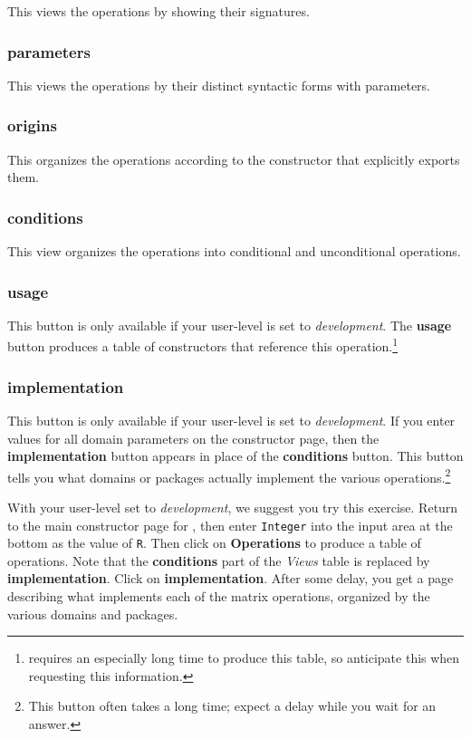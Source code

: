 {This views the operations by showing their signatures.

\subsubsection{parameters}

This views the operations by their distinct syntactic forms with
parameters.

\subsubsection{origins}

This organizes the operations according to the constructor that
explicitly exports them.

\subsubsection{conditions}

This view organizes the operations into conditional and unconditional
operations.

\subsubsection{usage}

This button is only available if your user-level is set to {\it
{}
development}.
The {\bf usage} button produces a table of constructors that reference this
operation.\footnote{\Language{} requires an especially long time to
produce this table, so anticipate this when requesting this
information.}

\subsubsection{implementation}

This button is only available if your user-level is set to {\it
development}.
If you enter values for all domain parameters on the constructor page,
then the {\bf implementation} button appears in place of the {\bf
conditions} button.
This button tells you what domains or packages actually implement the
various operations.\footnote{This button often takes a long time; expect
a delay while you wait for an answer.}

With your user-level set to {\it development}, we suggest you try this
exercise.
Return to the main constructor page for , then enter
{\tt Integer} into the input area at the bottom as the value of {\tt R}.
Then click on {\bf Operations} to produce a table of operations.
Note that the {\bf conditions} part of the {\it Views} table is
replaced by {\bf implementation}.
Click on {\bf implementation}.
After some delay, you get a page describing what implements each of
the matrix operations, organized by the various domains and packages.

}
